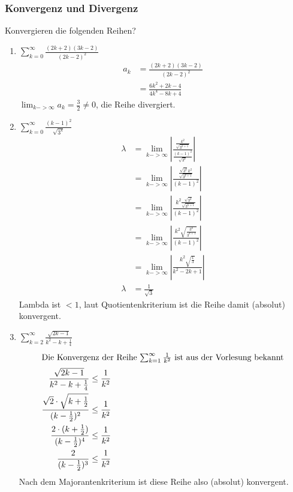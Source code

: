 \documentclass[11pt, a4paper]{article}
\newcommand{\abs}[1]{\left\lvert#1\right\rvert}
\begin{document}
\subsubsection{Konvergenz und Divergenz}
Konvergieren die folgenden Reihen?
\begin{enumerate}
	\item $\sum_{k=0}^\infty \frac{(2k+2)(3k-2)}{(2k-2)^2}$
		\begin{align*}
			a_k &= \frac{(2k+2)(3k-2)}{(2k-2)^2} \\
			&= \frac{6k^2+2k-4}{4k^4-8k+4}
		\end{align*}
		$\lim_{k->\infty} a_k = \frac{3}{2} \neq 0$, die Reihe divergiert.
	\item $\sum_{k=0}^\infty \frac{(k-1)^2}{\sqrt{3^k}}$
		\begin{align*}
			\lambda &= \lim_{k->\infty} \abs{ \frac{\frac{k^2}{\sqrt{3^{k+1}}}}{\frac{(k-1)^2}{\sqrt{3^k}}} } \tag{Quotientenkriterium} \\
			&= \lim_{k->\infty} \abs{ \frac{\frac{\sqrt{3^k} k^2}{\sqrt{3^{k+1}}}}{(k-1)^2} } \\
			&= \lim_{k->\infty} \abs{ \frac{k^2 \frac{\sqrt{3^k}}{\sqrt{3^{k+1}}}}{(k-1)^2} } \\
			&= \lim_{k->\infty} \abs{ \frac{k^2 \sqrt{\frac{3^k}{3^{k+1}}}}{(k-1)^2} } \\
			&= \lim_{k->\infty} \abs{ \frac{k^2 \sqrt{\frac{1}{3}}}{k^2-2k+1} } \\
			\lambda &= \frac{1}{\sqrt{3}}
		\end{align*}
		Lambda ist $<1$, laut Quotientenkriterium ist die Reihe damit (absolut) konvergent.
	\item $\sum_{k=2}^\infty \frac{\sqrt{2k-1}}{k^2-k+\frac{1}{4}}$
		\begin{align*}
			\shortintertext{Die Konvergenz der Reihe $\sum_{k=1}^\infty \frac{1}{k^2}$ ist aus der Vorlesung bekannt}
			\frac{\sqrt{2k-1}}{k^2-k+\frac{1}{4}} &\leq \frac{1}{k^2} \\
			\frac{\sqrt{2} \cdot \sqrt{k+\frac{1}{2}}}{(k-\frac{1}{2})^2} &\leq \frac{1}{k^2} \\
			\frac{2 \cdot (k+\frac{1}{2})}{(k-\frac{1}{2})^4} &\leq \frac{1}{k^2} \\
			\frac{2}{(k-\frac{1}{2})^3} &\leq \frac{1}{k^2}
		\end{align*}
		Nach dem Majorantenkriterium ist diese Reihe also (absolut) konvergent.
\end{enumerate}
\end{document}
